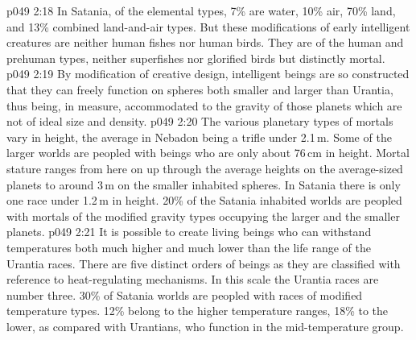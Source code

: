 \vs p049 2:18 In Satania, of the elemental types, 7\% are water, 10\% air, 70\% land, and 13\% combined land\hyp{}and\hyp{}air types. But these modifications of early intelligent creatures are neither human fishes nor human birds. They are of the human and prehuman types, neither superfishes nor glorified birds but distinctly mortal.
\vs p049 2:19 \bibnobreakspace {} By modification of creative design, intelligent beings are so constructed that they can freely function on spheres both smaller and larger than Urantia, thus being, in measure, accommodated to the gravity of those planets which are not of ideal size and density.
\vs p049 2:20 The various planetary types of mortals vary in height, the average in Nebadon being a trifle under 2.1\,m. Some of the larger worlds are peopled with beings who are only about 76\,cm in height. Mortal stature ranges from here on up through the average heights on the average\hyp{}sized planets to around 3\,m on the smaller inhabited spheres. In Satania there is only one race under 1.2\,m in height. 20\% of the Satania inhabited worlds are peopled with mortals of the modified gravity types occupying the larger and the smaller planets.
\vs p049 2:21 \bibnobreakspace {} It is possible to create living beings who can withstand temperatures both much higher and much lower than the life range of the Urantia races. There are five distinct orders of beings as they are classified with reference to heat\hyp{}regulating mechanisms. In this scale the Urantia races are number three. 30\% of Satania worlds are peopled with races of modified temperature types. 12\% belong to the higher temperature ranges, 18\% to the lower, as compared with Urantians, who function in the mid\hyp{}temperature group.
